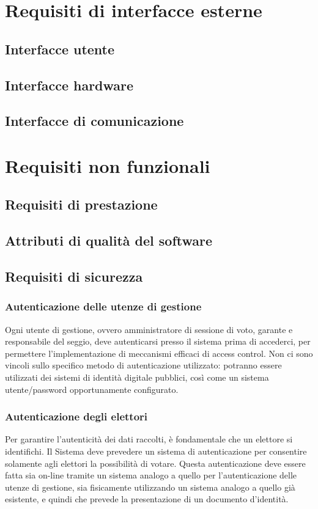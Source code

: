 \documentclass{report}
\begin{document}
\section{Requisiti di interfacce esterne}

\subsection{Interfacce utente}
\subsection{Interfacce hardware}
\subsection{Interfacce di comunicazione}
\section{Requisiti non funzionali}
\subsection{Requisiti di prestazione}
\subsection{Attributi di qualità del software}


\subsection{Requisiti di sicurezza}

\subsubsection{Autenticazione delle utenze di gestione}
Ogni utente di gestione, ovvero amministratore di sessione di voto, garante e responsabile del seggio, deve autenticarsi presso il sistema prima di accederci, per permettere l'implementazione di meccanismi efficaci di access control. 
Non ci sono vincoli sullo specifico metodo di autenticazione utilizzato: potranno essere utilizzati dei sistemi di identità digitale pubblici, così come un sistema utente/password opportunamente configurato.

\subsubsection{Autenticazione degli elettori}
Per garantire l'autenticità dei dati raccolti, è fondamentale che un elettore si identifichi. Il Sistema deve prevedere un sistema di autenticazione per consentire solamente agli elettori la possibilità di votare.
Questa autenticazione deve essere fatta sia on-line tramite un sistema analogo a quello per l'autenticazione delle utenze di gestione, sia fisicamente utilizzando un sistema analogo a quello già esistente, e quindi che prevede la presentazione di un documento d'identità.
\end{document}
